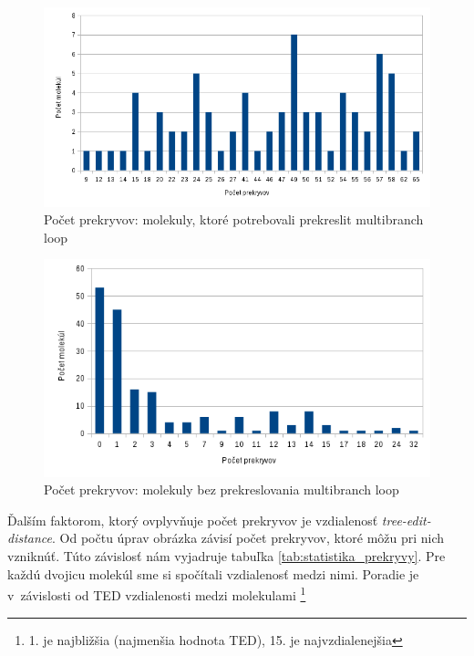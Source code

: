 \begin{figure}
  \includegraphics[width=1\textwidth]{../img/statistika/prekryvy-pocetmolekul-s-rotaciami}
  \caption{Počet prekryvov: molekuly, ktoré potrebovali prekreslit multibranch loop}
  \label{obr:statistika_prekryvy_bez_rotacii}
\end{figure}

\begin{figure}
  \includegraphics[width=1\textwidth]{../img/statistika/prekryvy-pocetmolekul-bez-rotacii}
  \caption{Počet prekryvov: molekuly bez prekreslovania multibranch loop}
  \label{obr:statistika_prekryvy_s_rotaciami}
\end{figure}

Ďalším faktorom, ktorý ovplyvňuje počet prekryvov je vzdialenosť \textit{tree-edit-distance}.
Od počtu úprav obrázka závisí počet prekryvov, ktoré môžu pri nich vzniknúť.
Túto závislosť nám vyjadruje tabuľka \ref{tab:statistika_prekryvy}.
Pre každú dvojicu molekúl sme si spočítali vzdialenosť medzi nimi.
Poradie je v~závislosti od TED vzdialenosti medzi molekulami%
\footnote{1. je najbližšia (najmenšia hodnota TED), 15. je najvzdialenejšia}


